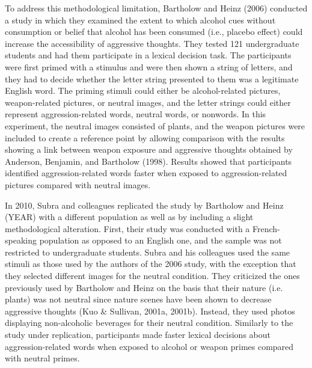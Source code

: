 \documentclass[authordate, serif, review]{jote-article}
\begin{document}
\begin{multicols}{2}
To address this methodological limitation, Bartholow and Heinz (2006) conducted a study in which they examined the extent to which alcohol cues without consumption or belief that alcohol has been consumed (i.e., placebo effect) could increase the accessibility of aggressive thoughts. They tested 121 undergraduate students and had them participate in a lexical decision task. The participants were first primed with a stimulus and were then shown a string of letters, and they had to decide whether the letter string presented to them was a legitimate English word. The priming stimuli could either be alcohol-related pictures, weapon-related pictures, or neutral images, and the letter strings could either represent aggression-related words, neutral words, or nonwords. In this experiment, the neutral images consisted of plants, and the weapon pictures were included to create a reference point by allowing comparison with the results showing a link between weapon exposure and aggressive thoughts obtained by Anderson, Benjamin, and Bartholow (1998). Results showed that participants identified aggression-related words faster when exposed to aggression-related pictures compared with neutral images.

In 2010, Subra and colleagues replicated the study by Bartholow and Heinz (YEAR) with a different population as well as by including a slight methodological alteration. First, their study was conducted with a French-speaking population as opposed to an English one, and the sample was not restricted to undergraduate students. Subra and his colleagues used the same stimuli as those used by the authors of the 2006 study, with the exception that they selected different images for the neutral condition. They criticized the ones previously used by Bartholow and Heinz on the basis that their nature (i.e. plants) was not neutral since nature scenes have been shown to decrease aggressive thoughts (Kuo \& Sullivan, 2001a, 2001b). Instead, they used photos displaying non-alcoholic beverages for their neutral condition. Similarly to the study under replication, participants made faster lexical decisions about aggression-related words when exposed to alcohol or weapon primes compared with neutral primes. 


\end{multicols}
\end{document}
